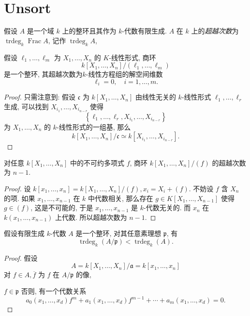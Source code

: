 \section{Unsort}

假设 \( A \) 是一个域 \( k \) 上的整环且其作为 \( k \)-代数有限生成.
\( A \) 在 \( k \) 上的\emph{超越次数}为 \( \operatorname{trdeg}_k
\operatorname{Frac} A\), 记作 \( \operatorname{trdeg}_kA \), 

\begin{proposition}
  假设 \( \ell_1, \ldots, \ell_m \) 为 \( X_1, \ldots, X_n \) 的 \( K
  \)-线性形式,
  商环
  \[
    k[X_1, \ldots, X_n]/(\ell_1, \ldots, \ell_m)
  \]
  是一个整环, 其超越次数为\( k \)-线性方程组的解空间维数
  \[
    \ell_i = 0,\quad i = 1, \ldots, m.
  \]
\end{proposition}
\begin{proof}
  只需注意到:
  假设 \( \mathfrak{c} \) 为 \( k[X_1, \ldots, X_n] \) 由线性无关的 \( k
  \)-线性形式 \( \ell_1, \ldots, \ell_r \) 生成, 可以找到 \( X_{i_1}, \ldots,
  X_{i_{n - r}} \) 使得
  \[
    \left\lbrace \ell_1, \ldots, \ell_r, X_{i_1}, \ldots, X_{i_{n - r}} \right\rbrace
  \]
  为 \( X_1, \ldots, X_n \) 的 \( k \)-线性形式的一组基, 那么
  \[
    k[X_1, \ldots, X_n]/\mathfrak{c} \simeq k[X_{i_1}, \ldots, X_{i_{n - r}}].
  \]
\end{proof}

\begin{proposition}
  对任意 \( k[X_1, \ldots, X_n] \) 中的不可约多项式 \( f \), 商环 \( k[X_1,
  \ldots, X_n]/(f) \) 的超越次数为 \( n - 1 \).
\end{proposition}
\begin{proof}
  设 \( k[x_1, \ldots, x_n] = k[X_1, \ldots, X_n] / (f), x_i = X_i + (f) \).
  不妨设 \( f \) 含 \( X_n \) 的项.
  如果 \( x_1, \ldots, x_{n - 1} \) 在 \( k \) 中代数相关,
  那么存在 \( g \in K[X_1, \ldots, X_{n - 1}] \) 使得 \( g \in (f) \),
  这是不可能的, 于是 \( x_1, \ldots, x_{n - 1} \) 是 \( k \)-代数无关的.
  而 \( x_n \) 在 \( k(x_1, \ldots, x_{n - 1}) \) 上代数.
  所以超越次数为 \( n - 1 \).
\end{proof}

\begin{proposition}
  假设有限生成 \( k \)-代数 \( A \) 是一个整环, 对其任意素理想 \( \mathfrak{p}
  \), 有
  \[
    \operatorname{trdeg}_k(A/\mathfrak{p}) < \operatorname{trdeg}_k(A).
  \]
\end{proposition}
\begin{proof}
  假设
  \[
    A = k[X_1, \ldots, X_n] / \mathfrak{a} = k[x_1, \ldots, x_n]
  \]
  对 \( f \in A, \overline{f} \) 为 \( f \) 在 \( A / \mathfrak{p} \) 的像,


  \( f \in \mathfrak{p} \)
  否则, 有一个代数关系
  \[
    a_0(x_1, \ldots, x_d)f^m + a_1(x_1, \ldots, x_d) f^{m - 1} + \cdots +
    a_m(x_1, \ldots, x_d) = 0.
  \]
\end{proof}
